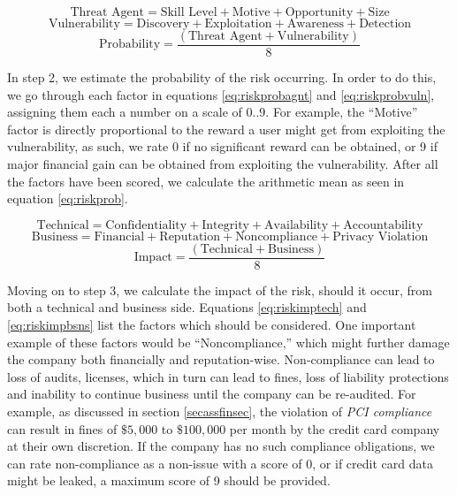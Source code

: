 \documentclass[a4paper,12pt]{article}
\begin{document}
	\begin{equation} \label{eq:riskprobagnt}
		\textrm{Threat Agent} = \textrm{Skill Level} + \textrm{Motive} + \textrm{Opportunity} + \textrm{Size}
	\end{equation}
	\begin{equation} \label{eq:riskprobvuln}
		\textrm{Vulnerability} = \textrm{Discovery} + \textrm{Exploitation} + \textrm{Awareness} + \textrm{Detection}
	\end{equation}
	\begin{equation} \label{eq:riskprob}
		\textrm{Probability} = \frac{(\textrm{Threat Agent} + \textrm{Vulnerability})}{8}
	\end{equation}
	
	In step 2, we estimate the probability of the risk occurring. In order to do this, we go through each factor in equations \ref{eq:riskprobagnt} and \ref{eq:riskprobvuln}, assigning them each a number on a scale of $0..9$. For example, the ``Motive'' factor is directly proportional to the reward a user might get from exploiting the vulnerability, as such, we rate 0 if no significant reward can be obtained, or 9 if major financial gain can be obtained from exploiting the vulnerability. After all the factors have been scored, we calculate the arithmetic mean as seen in equation \ref{eq:riskprob}.
	
	\begin{equation} \label{eq:riskimptech}
		\textrm{Technical} = \textrm{Confidentiality} + \textrm{Integrity} + \textrm{Availability} + \textrm{Accountability}
	\end{equation}
	\begin{equation} \label{eq:riskimpbsns}
		\textrm{Business} = \textrm{Financial} + \textrm{Reputation} + \textrm{Noncompliance} + \textrm{Privacy Violation}
	\end{equation}
	\begin{equation} \label{eq:riskimp}
		\textrm{Impact} = \frac{(\textrm{Technical} + \textrm{Business})}{8}
	\end{equation}
		
	Moving on to step 3, we calculate the impact of the risk, should it occur, from both a technical and business side. Equations \ref{eq:riskimptech} and \ref{eq:riskimpbsns} list the factors which should be considered. One important example of these factors would be ``Noncompliance,'' which might further damage the company both financially and reputation-wise. Non-compliance can lead to loss of audits, licenses, which in turn can lead to fines, loss of liability protections and inability to continue business until the company can be re-audited. For example, as discussed in section \ref{secassfinsec}, the violation of \textit{PCI compliance} can result in fines of $\$5,000$ to $\$100,000$ per month\cite{pcicompl} by the credit card company at their own discretion. If the company has no such compliance obligations, we can rate non-compliance as a non-issue with a score of 0, or if credit card data might be leaked, a maximum score of 9 should be provided.
	
\end{document}
